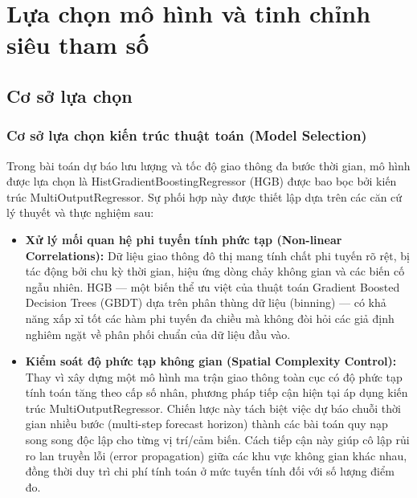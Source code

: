 \section{Lựa chọn mô hình và tinh chỉnh siêu tham số}

    \subsection{Cơ sở lựa chọn}

    \subsubsection{Cơ sở lựa chọn kiến trúc thuật toán (Model Selection)}
    Trong bài toán dự báo lưu lượng và tốc độ giao thông đa bước thời gian, mô hình được lựa chọn là HistGradientBoostingRegressor (HGB) được bao bọc bởi kiến trúc MultiOutputRegressor. Sự phối hợp này được thiết lập dựa trên các căn cứ lý thuyết và thực nghiệm sau:
    \begin{itemize}
        \item \textbf{Xử lý mối quan hệ phi tuyến tính phức tạp (Non-linear Correlations):} Dữ liệu giao thông đô thị mang tính chất phi tuyến rõ rệt, bị tác động bởi chu kỳ thời gian, hiệu ứng dòng chảy không gian và các biến cố ngẫu nhiên. HGB — một biến thể ưu việt của thuật toán Gradient Boosted Decision Trees (GBDT) dựa trên phân thùng dữ liệu (binning) — có khả năng xấp xỉ tốt các hàm phi tuyến đa chiều mà không đòi hỏi các giả định nghiêm ngặt về phân phối chuẩn của dữ liệu đầu vào.
        \item \textbf{Kiểm soát độ phức tạp không gian (Spatial Complexity Control):} Thay vì xây dựng một mô hình ma trận giao thông toàn cục có độ phức tạp tính toán tăng theo cấp số nhân, phương pháp tiếp cận hiện tại áp dụng kiến trúc MultiOutputRegressor. Chiến lược này tách biệt việc dự báo chuỗi thời gian nhiều bước (multi-step forecast horizon) thành các bài toán quy nạp song song độc lập cho từng vị trí/cảm biến. Cách tiếp cận này giúp cô lập rủi ro lan truyền lỗi (error propagation) giữa các khu vực không gian khác nhau, đồng thời duy trì chi phí tính toán ở mức tuyến tính đối với số lượng điểm đo.
    \end{itemize}

